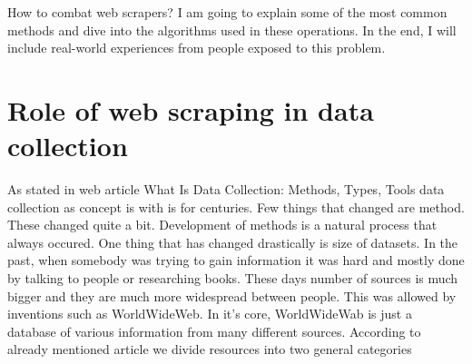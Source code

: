 \documentclass[10pt,twoside]{article}
\begin{document}
How to combat web scrapers? I am going to explain some of the most common methods and dive into the algorithms used in these operations. In the end, I will include real-world experiences from people exposed to this problem.

\section{Role of web scraping in data collection}\label{data-privacy}
As stated in web article What Is Data Collection: Methods, Types, Tools \cite{simplilearn-data-collection} data collection as concept is with is for centuries. Few things that changed are method. These changed quite a bit. Development of methods is a natural process that always occured. One thing that has changed drastically is size of datasets. In the past, when somebody was trying to gain information it was hard and mostly done by talking to people or researching books. These days number of sources is much bigger and they are much more widespread between people. This was allowed by inventions such as WorldWideWeb. In it's core, WorldWideWab is just a database of various information from many different sources.
According to already mentioned article \cite{simplilearn-data-collection} we divide resources into two general categories
\end{document}

